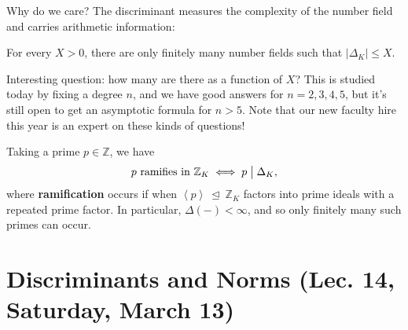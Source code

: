 \begin{remark}

Why do we care? The discriminant measures the complexity of the number
field and carries arithmetic information:

\begin{theorem}[Hermite]

For every \(X>0\), there are only finitely many number fields such that
\({\left\lvert { {\Delta}_K } \right\rvert} \leq X\).

\end{theorem}

\begin{remark}

Interesting question: how many are there as a function of \(X\)? This is
studied today by fixing a degree \(n\), and we have good answers for
\(n=2,3,4,5\), but it's still open to get an asymptotic formula for
\(n>5\). Note that our new faculty hire this year is an expert on these
kinds of questions!

\end{remark}

\begin{theorem}[Dedekind]

Taking a prime \(p\in {\mathbb{Z}}\), we have
\begin{align*}
p \text{ ramifies in } {\mathbb{Z}}_K \iff p \bigm|{\Delta}_K
,\end{align*}
where \textbf{ramification} occurs if when
\(\left\langle{ p }\right\rangle{~\trianglelefteq~}{\mathbb{Z}}_K\)
factors into prime ideals with a repeated prime factor. In particular,
\({\Delta}({-}) < \infty\), and so only finitely many such primes can
occur.

\end{theorem}

\end{remark}

\hypertarget{discriminants-and-norms-lec.-14-saturday-march-13}{%
\section{Discriminants and Norms (Lec. 14, Saturday, March
13)}\label{discriminants-and-norms-lec.-14-saturday-march-13}}

